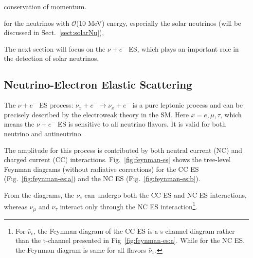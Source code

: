 conservation of momentum.

for the neutrinos with $\mathcal{O}$(10 MeV) energy, especially the solar neutrinos (will be discussed in Sect.~\ref{sect:solarNu}), 

The next section will focus on the $\nu+e^-$ ES, which plays an important role in the detection of solar neutrinos.



\subsection{Neutrino-Electron Elastic Scattering}\label{sect:NuEStheory}
The $\nu+e^-$ ES process: $\nu_x + e^{-}\to\nu_x+e^-$ is a pure leptonic process and can be precisely described by the electroweak theory in the SM. Here $x=e,\mu,\tau$, which means the $\nu+e^-$ ES is sensitive to all neutrino flavors. It is valid for both neutrino and antineutrino.

The amplitude for this process is contributed by both neutral current (NC) and charged current (CC) interactions. Fig.~\ref{fig:feynman-es} shows the tree-level Feynman diagrams (without radiative corrections) for the CC ES (Fig.~\ref{fig:feynman-es:a}) and the NC ES (Fig.~\ref{fig:feynman-es:b}).

From the diagrams, the $\nu_e$ can undergo both the CC ES and NC ES interactions, whereas $\nu_{\mu}$ and $\nu_\tau$ interact only through the NC ES interaction\footnote{For $\bar{\nu}_e$, the Feynman diagram of the CC ES is a s-channel diagram rather than the t-channel presented in Fig~\ref{fig:feynman-es:a}. While for the NC ES, the Feynman diagram is same for all flavors $\bar{\nu}_x$.}\cite{giunti2007fundamentals,xing2011neutrinos}. 

